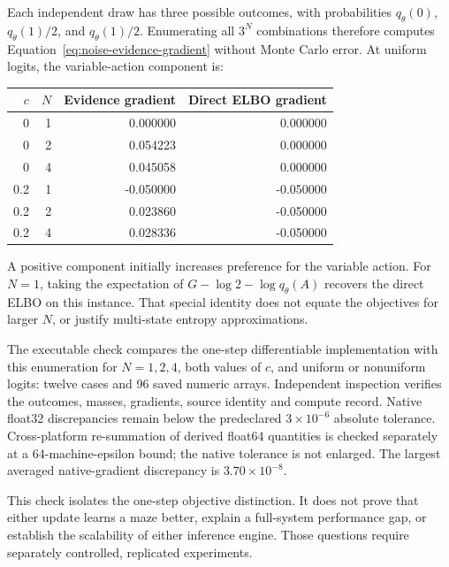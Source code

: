 Each independent draw has three possible outcomes, with probabilities
$q_\theta(0)$, $q_\theta(1)/2$, and $q_\theta(1)/2$. Enumerating all $3^N$
combinations therefore computes Equation~\eqref{eq:noise-evidence-gradient}
without Monte Carlo error. At uniform logits, the variable-action component is:
\begin{center}
\begin{tabular}{rrrr}
\toprule
$c$ & $N$ & Evidence gradient & Direct ELBO gradient \\
\midrule
0   & 1 & 0.000000  & 0.000000 \\
0   & 2 & 0.054223  & 0.000000 \\
0   & 4 & 0.045058  & 0.000000 \\
0.2 & 1 & -0.050000 & -0.050000 \\
0.2 & 2 & 0.023860  & -0.050000 \\
0.2 & 4 & 0.028336  & -0.050000 \\
\bottomrule
\end{tabular}
\end{center}
\begin{samepage}
A positive component initially increases preference for the variable action.
For $N=1$, taking the expectation of $G-\log2-\log q_\theta(A)$ recovers
the direct ELBO on this instance. That special identity does not equate the
objectives for larger $N$, or justify multi-state entropy approximations.
\end{samepage}

The executable check compares the one-step differentiable implementation with
this enumeration for $N=1,2,4$, both values of $c$, and uniform or nonuniform
logits: twelve cases and 96 saved numeric arrays. Independent inspection
verifies the outcomes, masses, gradients, source identity and compute record.
Native float32 discrepancies remain below the predeclared $3\times10^{-6}$
absolute tolerance. Cross-platform re-summation of derived float64 quantities
is checked separately at a 64-machine-epsilon bound; the native tolerance is
not enlarged. The largest averaged native-gradient discrepancy is
$3.70\times10^{-8}$.

This check isolates the one-step objective distinction. It does not prove
that either update learns a maze better, explain a full-system performance
gap, or establish the scalability of either inference engine. Those questions
require separately controlled, replicated experiments.
